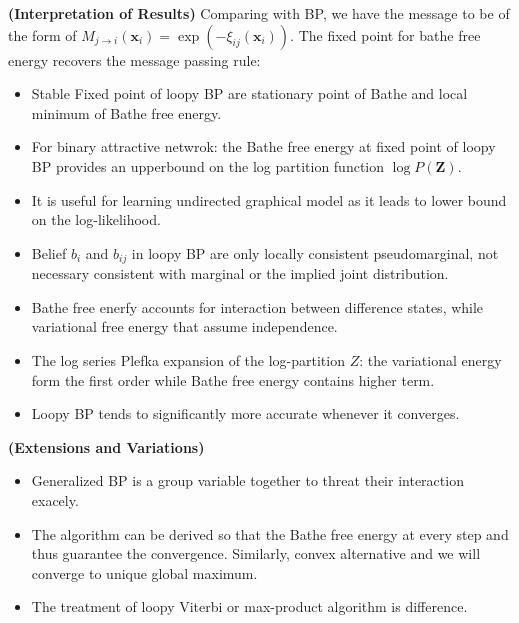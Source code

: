 \begin{remark}{\textbf{(Interpretation of Results)}}
    Comparing with BP, we have the message to be of the form of $M_{j\rightarrow i}(\boldsymbol x_i) = \exp(-\xi_{ij}(\boldsymbol x_i))$. The fixed point for bathe free energy recovers the message passing rule:
    \begin{itemize}
        \item Stable Fixed point of loopy BP are stationary point of Bathe and local minimum of Bathe free energy. 
        \item For binary attractive netwrok: the Bathe free energy at fixed point of loopy BP provides an upperbound on the log partition function $\log P(\boldsymbol Z)$. 
        \item It is useful for learning undirected graphical model as it leads to lower bound on the log-likelihood. 
        \item Belief $b_i$ and $b_{ij}$ in loopy BP are only locally consistent pseudomarginal, not necessary consistent with marginal or the implied joint distribution. 
        \item Bathe free enerfy accounts for interaction between difference states, while variational free energy that assume independence. 
        \item The log series Plefka expansion of the log-partition $Z$: the variational energy form the first order while Bathe free energy contains higher term. 
        \item Loopy BP tends to significantly more accurate whenever it converges. 
    \end{itemize}
\end{remark}

\begin{remark}{\textbf{(Extensions and Variations)}}
    \begin{itemize}
        \item Generalized BP is a group variable together to threat their interaction exacely. 
        \item The algorithm can be derived so that the Bathe free energy at every step and thus guarantee the convergence. Similarly, convex alternative and we will converge to unique global maximum. 
        \item The treatment of loopy Viterbi or max-product algorithm is difference. 
    \end{itemize}
\end{remark}
